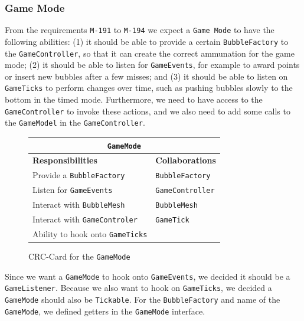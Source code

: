 \documentclass[a4paper]{article}
\begin{document}
\subsubsection{Game Mode}
\label{sec:gmmde}
From the requirements \texttt{M-191} to \texttt{M-194} we expect a \texttt{Game Mode} to have the following abilities: (1) it should be able to provide a certain \texttt{BubbleFactory} to the \texttt{GameController}, so that it can create the correct ammunation for the game mode; (2) it should be able to listen for \texttt{GameEvents}, for example to award points or insert new bubbles after a few misses; and (3) it should be able to listen on \texttt{GameTicks} to perform changes over time, such as pushing bubbles slowly to the bottom in the timed mode. Furthermore, we need to have access to the \texttt{GameController} to invoke these actions, and we also need to add some calls to the \texttt{GameModel} in the \texttt{GameController}.

\begin{figure}[H]
    \begin{center}
    \begin{tabular}{ | p{8cm} | p{4cm} | }
      \multicolumn{2}{c}{\texttt{GameMode}} \\ \hline
      \textbf{Responsibilities} & \textbf{Collaborations} \\ \hline
      Provide a \texttt{BubbleFactory} & \texttt{BubbleFactory} \\
      Listen for \texttt{GameEvents} & \texttt{GameController} \\
      Interact with \texttt{BubbleMesh} & \texttt{BubbleMesh} \\
      Interact with \texttt{GameControler} & \texttt{GameTick} \\
      Ability to hook onto \texttt{GameTicks} & \\
      \hline
    \end{tabular}
    \end{center}
    \caption{CRC-Card for the \texttt{GameMode}}
\end{figure}

Since we want a \texttt{GameMode} to hook onto \texttt{GameEvents}, we decided it should be a \texttt{GameListener}. Because we also want to hook on \texttt{GameTicks}, we decided a \texttt{GameMode} should also be \texttt{Tickable}. For the \texttt{BubbleFactory} and name of the \texttt{GameMode}, we defined getters in the \texttt{GameMode} interface.
\end{document}
